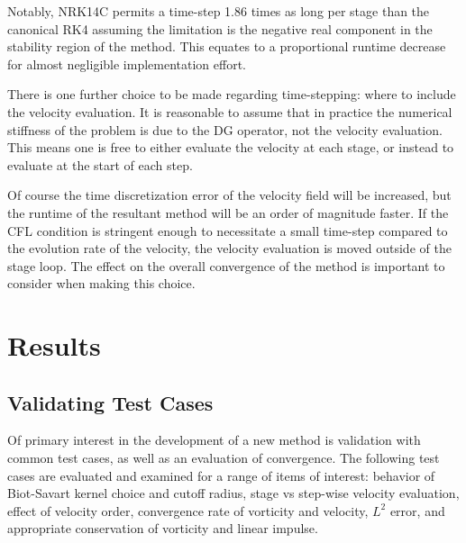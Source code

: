 \documentclass[letterpaper,12pt]{report}
\begin{document}
Notably, NRK14C permits a time-step 1.86 times as long per stage than the canonical RK4 assuming the limitation is the negative real component in the stability region of the method. This equates to a proportional runtime decrease for almost negligible implementation effort. 

There is one further choice to be made regarding time-stepping: where to include the velocity evaluation. It is reasonable to assume that in practice the numerical stiffness of the problem is due to the DG operator, not the velocity evaluation. This means one is free to either evaluate the velocity at each stage, or instead to evaluate at the start of each step. 

Of course the time discretization error of the velocity field will be increased, but the runtime of the resultant method will be an order of magnitude faster. If the CFL condition is stringent enough to necessitate a small time-step compared to the evolution rate of the velocity, the velocity evaluation is moved outside of the stage loop. The effect on the overall convergence of the method is important to consider when making this choice.

\chapter{Results}
\section{Validating Test Cases}
Of primary interest in the development of a new method is validation with common test cases, as well as an evaluation of convergence. The following test cases are evaluated and examined for a range of items of interest: behavior of Biot-Savart kernel choice and cutoff radius, stage vs step-wise velocity evaluation, effect of velocity order, convergence rate of vorticity and velocity, $L^2$ error, and appropriate conservation of vorticity and linear impulse.
\end{document}

